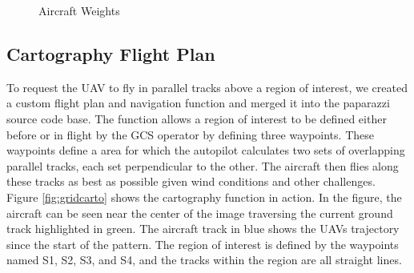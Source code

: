 \documentclass[a4paper,11pt]{report}
\begin{document}
\begin{figure}[htb]
  \centering
  \caption{Aircraft Weights}
  \label{fig:weights}
\end{figure} 

\subsection{Cartography Flight Plan}

To request the UAV to fly in parallel tracks above a region of interest, we created a custom flight plan and navigation function and merged it into the paparazzi source code base. The function allows a region of interest to be defined either before or in flight by the GCS operator by defining three waypoints. These waypoints define a area for which the autopilot calculates two sets of overlapping parallel tracks, each set perpendicular to the other. The aircraft then flies along these tracks as best as possible given wind conditions and other challenges. Figure \ref{fig:gridcarto} shows the cartography function in action. In the figure, the aircraft can be seen near the center of the image traversing the current ground track highlighted in green. The aircraft track in blue shows the UAVs trajectory since the start of the pattern. The region of interest is defined by the waypoints named S1, S2, S3, and S4, and the tracks within the region are all straight lines.
\end{document}
